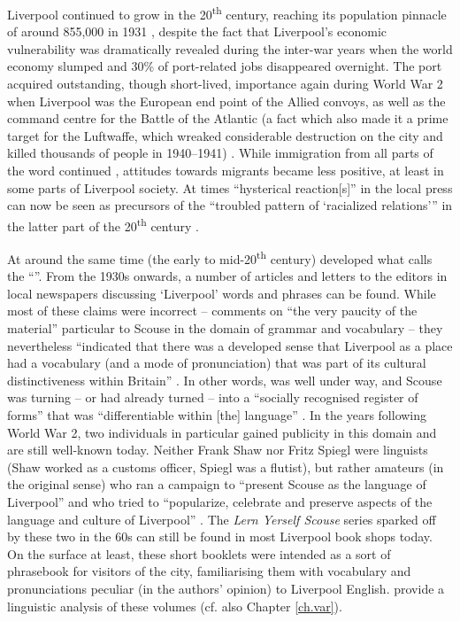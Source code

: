 Liverpool continued to grow in the 20\textsuperscript{th} century, reaching its population pinnacle of around 855,000 in 1931 \citep[cf.][171]{pooley2006}, despite the fact that Liverpool's economic vulnerability was dramatically revealed during the inter-war years when the world economy slumped and 30\% of port-related jobs disappeared overnight.
The port acquired outstanding, though short-lived, importance again during World War 2 when Liverpool was the European end point of the Allied convoys, as well as the command centre for the Battle of the Atlantic (a fact which also made it a prime target for the Luftwaffe, which wreaked considerable destruction on the city and killed thousands of people in 1940--1941) \citep[cf.][393 and 405]{murden2006}.
While immigration from all parts of the word continued \citep[cf.][119]{honeybone2007}, attitudes towards migrants became less positive, at least in some parts of Liverpool society.
At times ``hysterical reaction[s]'' in the local press can now be seen as precursors of the ``troubled pattern of `racialized relations''' in the latter part of the 20\textsuperscript{th} century \citep[cf.][23]{belchem2006a}.

At around the same time (the early to mid-20\textsuperscript{th} century) developed what \citet[40]{crowley2012} calls the ``''.
From the 1930s onwards, a number of articles and letters to the editors in local newspapers discussing `Liverpool' words and phrases can be found.
While most of these claims were incorrect -- \citet[48]{knowles1973} comments on ``the very paucity of the material'' particular to Scouse in the domain of grammar and vocabulary -- they nevertheless ``indicated that there was a developed sense that Liverpool as a place had a vocabulary (and a mode of pronunciation) that was part of its cultural distinctiveness within Britain'' \parencite[42]{crowley2012}.
In other words, \emph{} was well under way, and Scouse was turning -- or had already turned -- into a ``socially recognised register of forms'' that was ``differentiable within [the] language'' \parencite[231]{agha2003}.
In the years following World War 2, two individuals in particular gained publicity in this domain and are still well-known today.
Neither Frank Shaw nor Fritz Spiegl were linguists (Shaw worked as a customs officer, Spiegl was a flutist), but rather amateurs (in the original sense) who ran a campaign to ``present Scouse as the language of Liverpool'' and who tried to ``popularize, celebrate and preserve aspects of the language and culture of Liverpool'' \citep[64--65]{crowley2012}.
The \emph{Lern Yerself Scouse} series sparked off by these two in the 60s can still be found in most Liverpool book shops today.
On the surface at least, these short booklets were intended as a sort of phrasebook for visitors of the city, familiarising them with vocabulary and pronunciations peculiar (in the authors' opinion) to Liverpool English. \citet{honeybonewatson2013} provide a linguistic analysis of these volumes (cf. also Chapter \ref{ch.var}).

